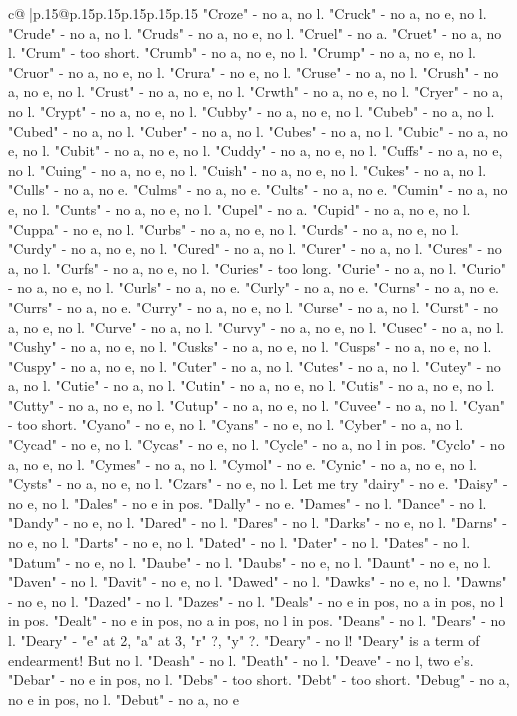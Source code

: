 \documentclass{article}
\begin{document}
{\begin{supertabular}{c@{$\;$}|p{.15\linewidth}@{}p{.15\linewidth}p{.15\linewidth}p{.15\linewidth}p{.15\linewidth}p{.15\linewidth}}
{{{"Croze" {-} no a, no l. "Cruck" {-} no a, no e, no l. "Crude" {-} no a, no l. "Cruds" {-} no a, no e, no l. "Cruel" {-} no a. "Cruet" {-} no a, no l. "Crum" {-} too short. "Crumb" {-} no a, no e, no l. "Crump" {-} no a, no e, no l. "Cruor" {-} no a, no e, no l. "Crura" {-} no e, no l. "Cruse" {-} no a, no l. "Crush" {-} no a, no e, no l. "Crust" {-} no a, no e, no l. "Crwth" {-} no a, no e, no l. "Cryer" {-} no a, no l. "Crypt" {-} no a, no e, no l. "Cubby" {-} no a, no e, no l. "Cubeb" {-} no a, no l. "Cubed" {-} no a, no l. "Cuber" {-} no a, no l. "Cubes" {-} no a, no l. "Cubic" {-} no a, no e, no l. "Cubit" {-} no a, no e, no l. "Cuddy" {-} no a, no e, no l. "Cuffs" {-} no a, no e, no l. "Cuing" {-} no a, no e, no l. "Cuish" {-} no a, no e, no l. "Cukes" {-} no a, no l. "Culls" {-} no a, no e. "Culms" {-} no a, no e. "Cults" {-} no a, no e. "Cumin" {-} no a, no e, no l. "Cunts" {-} no a, no e, no l. "Cupel" {-} no a. "Cupid" {-} no a, no e, no l. "Cuppa" {-} no e, no l. "Curbs" {-} no a, no e, no l. "Curds" {-} no a, no e, no l. "Curdy" {-} no a, no e, no l. "Cured" {-} no a, no l. "Curer" {-} no a, no l. "Cures" {-} no a, no l. "Curfs" {-} no a, no e, no l. "Curies" {-} too long. "Curie" {-} no a, no l. "Curio" {-} no a, no e, no l. "Curls" {-} no a, no e. "Curly" {-} no a, no e. "Curns" {-} no a, no e. "Currs" {-} no a, no e. "Curry" {-} no a, no e, no l. "Curse" {-} no a, no l. "Curst" {-} no a, no e, no l. "Curve" {-} no a, no l. "Curvy" {-} no a, no e, no l. "Cusec" {-} no a, no l. "Cushy" {-} no a, no e, no l. "Cusks" {-} no a, no e, no l. "Cusps" {-} no a, no e, no l. "Cuspy" {-} no a, no e, no l. "Cuter" {-} no a, no l. "Cutes" {-} no a, no l. "Cutey" {-} no a, no l. "Cutie" {-} no a, no l. "Cutin" {-} no a, no e, no l. "Cutis" {-} no a, no e, no l. "Cutty" {-} no a, no e, no l. "Cutup" {-} no a, no e, no l. "Cuvee" {-} no a, no l. "Cyan" {-} too short. "Cyano" {-} no e, no l. "Cyans" {-} no e, no l. "Cyber" {-} no a, no l. "Cycad" {-} no e, no l. "Cycas" {-} no e, no l. "Cycle" {-} no a, no l in pos. "Cyclo" {-} no a, no e, no l. "Cymes" {-} no a, no l. "Cymol" {-} no e. "Cynic" {-} no a, no e, no l. "Cysts" {-} no a, no e, no l. "Czars" {-} no e, no l. Let me try "dairy" {-} no e. "Daisy" {-} no e, no l. "Dales" {-} no e in pos. "Dally" {-} no e. "Dames" {-} no l. "Dance" {-} no l. "Dandy" {-} no e, no l. "Dared" {-} no l. "Dares" {-} no l. "Darks" {-} no e, no l. "Darns" {-} no e, no l. "Darts" {-} no e, no l. "Dated" {-} no l. "Dater" {-} no l. "Dates" {-} no l. "Datum" {-} no e, no l. "Daube" {-} no l. "Daubs" {-} no e, no l. "Daunt" {-} no e, no l. "Daven" {-} no l. "Davit" {-} no e, no l. "Dawed" {-} no l. "Dawks" {-} no e, no l. "Dawns" {-} no e, no l. "Dazed" {-} no l. "Dazes" {-} no l. "Deals" {-} no e in pos, no a in pos, no l in pos. "Dealt" {-} no e in pos, no a in pos, no l in pos. "Deans" {-} no l. "Dears" {-} no l. "Deary" {-} "e" at 2, "a" at 3, "r" ?, "y" ?. "Deary" {-} no l! "Deary" is a term of endearment! But no l. "Deash" {-} no l. "Death" {-} no l. "Deave" {-} no l, two e's. "Debar" {-} no e in pos, no l. "Debs" {-} too short. "Debt" {-} too short. "Debug" {-} no a, no e in pos, no l. "Debut" {-} no a, no e }}}
\end{supertabular}}
\end{document}

